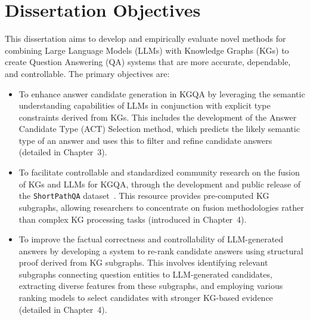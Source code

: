 \section*{Dissertation Objectives}
\label{sec:synopsis:objectives}
This dissertation aims to develop and empirically evaluate novel methods for combining Large Language Models (LLMs) with Knowledge Graphs (KGs) to create Question Answering (QA) systems that are more accurate, dependable, and controllable. The primary objectives are:
\begin{itemize}
    \item To enhance answer candidate generation in KGQA by leveraging the semantic understanding capabilities of LLMs in conjunction with explicit type constraints derived from KGs. This includes the development of the Answer Candidate Type (ACT) Selection method, which predicts the likely semantic type of an answer and uses this to filter and refine candidate answers (detailed in Chapter~3).
    \item To facilitate controllable and standardized community research on the fusion of KGs and LLMs for KGQA, through the development and public release of the \texttt{ShortPathQA} dataset~\cite{DBLP:conf/nldb/SalnikovSPQA25}. This resource provides pre-computed KG subgraphs, allowing researchers to concentrate on fusion methodologies rather than complex KG processing tasks (introduced in Chapter~4).
    \item To improve the factual correctness and controllability of LLM-generated answers by developing a system to re-rank candidate answers using structural proof derived from KG subgraphs. This involves identifying relevant subgraphs connecting question entities to LLM-generated candidates, extracting diverse features from these subgraphs, and employing various ranking models to select candidates with stronger KG-based evidence (detailed in Chapter~4).
\end{itemize}

